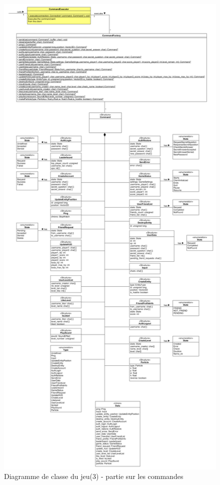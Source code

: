 \documentclass[french]{article}
\begin{document}
\begin{figure}[!htbp]
    \centering
    \includegraphics[scale=0.21, angle=0]{class_diagram/class_diagramm_command.png}
    \caption{Diagramme de classe du jeu(3) - partie sur les commandes}
    \label{class diagram:game-gameplay}
\end{figure}
\end{document}
